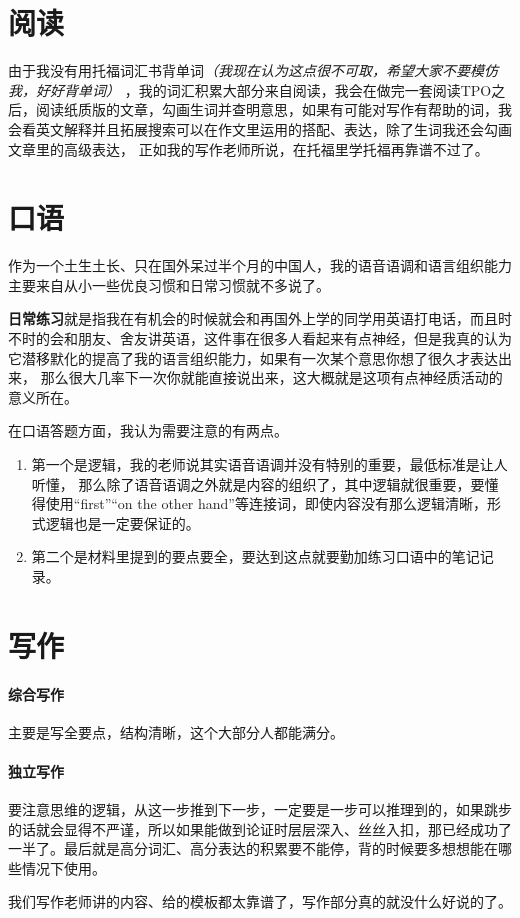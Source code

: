 \documentclass[blue,cn]{elegantbookex}
\begin{document}
\section{阅读}

    由于我没有用托福词汇书背单词\textsl{（我现在认为这点很不可取，希望大家不要模仿我，好好背单词）}
    ，我的词汇积累大部分来自阅读，我会在做完一套阅读TPO之后，阅读纸质版的文章，勾画生词并查明意思，如果有可能对写作有帮助的词，我会看英文解释并且拓展搜索可以在作文里运用的搭配、表达，除了生词我还会勾画文章里的高级表达，
    正如我的写作老师所说，在托福里学托福再靠谱不过了。

\section{口语}
    作为一个土生土长、只在国外呆过半个月的中国人，我的语音语调和语言组织能力主要来自从小一些优良习惯和日常习惯就不多说了。
    
    \textbf{日常练习}就是指我在有机会的时候就会和再国外上学的同学用英语打电话，而且时不时的会和朋友、舍友讲英语，这件事在很多人看起来有点神经，但是我真的认为它潜移默化的提高了我的语言组织能力，如果有一次某个意思你想了很久才表达出来，
    那么很大几率下一次你就能直接说出来，这大概就是这项有点神经质活动的意义所在。


    在口语答题方面，我认为需要注意的有两点。
\begin{enumerate}
    \item 第一个是逻辑，我的老师说其实语音语调并没有特别的重要，最低标准是让人听懂，
    那么除了语音语调之外就是内容的组织了，其中逻辑就很重要，要懂得使用“first”“on the other hand”等连接词，即使内容没有那么逻辑清晰，形式逻辑也是一定要保证的。
    \item 第二个是材料里提到的要点要全，要达到这点就要勤加练习口语中的笔记记录。
\end{enumerate}


\section{写作}
\paragraph{综合写作}主要是写全要点，结构清晰，这个大部分人都能满分。
\paragraph{独立写作}要注意思维的逻辑，从这一步推到下一步，一定要是一步可以推理到的，如果跳步的话就会显得不严谨，所以如果能做到论证时层层深入、丝丝入扣，那已经成功了一半了。最后就是高分词汇、高分表达的积累要不能停，背的时候要多想想能在哪些情况下使用。


\begin{note}
	我们写作老师讲的内容、给的模板都太靠谱了，写作部分真的就没什么好说的了。
	
\end{note}
    
\end{document}
